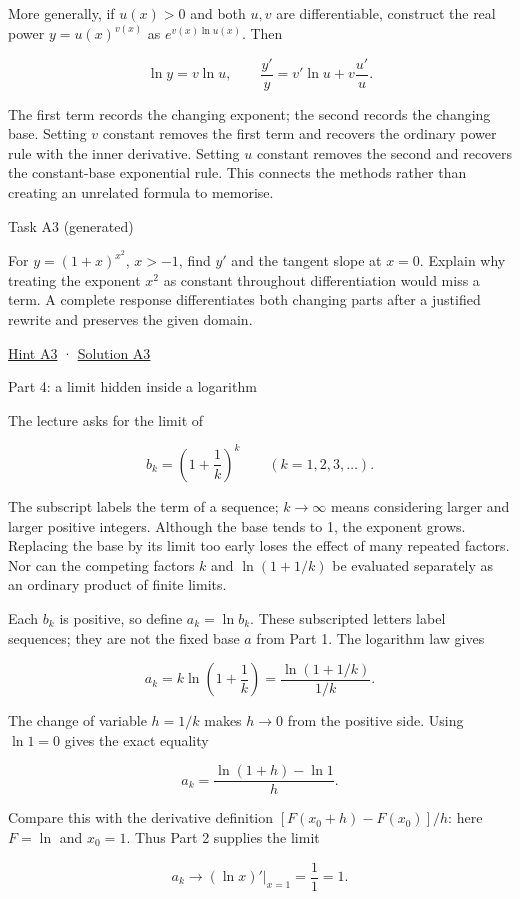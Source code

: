 \documentclass[
  11pt,
]{article}
\begin{document}
More generally, if \(u(x)>0\) and both \(u,v\) are differentiable,
construct the real power \(y=u(x)^{v(x)}\) as \(e^{v(x)\ln u(x)}\). Then

\[
\ln y=v\ln u,\qquad
\frac{y'}{y}=v'\ln u+v\frac{u'}u.
\]

The first term records the changing exponent; the second records the
changing base. Setting \(v\) constant removes the first term and
recovers the ordinary power rule with the inner derivative. Setting
\(u\) constant removes the second and recovers the constant-base
exponential rule. This connects the methods rather than creating an
unrelated formula to memorise.

Task A3 (generated)

For \(y=(1+x)^{x^2}\), \(x>-1\), find \(y'\) and the tangent slope at
\(x=0\). Explain why treating the exponent \(x^2\) as constant
throughout differentiation would miss a term. A complete response
differentiates both changing parts after a justified rewrite and
preserves the given domain.

\protect\hyperlink{hint-a3}{Hint A3} ·
\protect\hyperlink{solution-a3}{Solution A3}

Part 4: a limit hidden inside a logarithm

The lecture asks for the limit of

\[
b_k=\left(1+\frac1k\right)^k\qquad(k=1,2,3,\ldots).
\]

The subscript labels the term of a sequence; \(k\to\infty\) means
considering larger and larger positive integers. Although the base tends
to 1, the exponent grows. Replacing the base by its limit too early
loses the effect of many repeated factors. Nor can the competing factors
\(k\) and \(\ln(1+1/k)\) be evaluated separately as an ordinary product
of finite limits.

Each \(b_k\) is positive, so define \(a_k=\ln b_k\). These subscripted
letters label sequences; they are not the fixed base \(a\) from Part 1.
The logarithm law gives

\[
a_k=k\ln\left(1+\frac1k\right)
=\frac{\ln(1+1/k)}{1/k}.
\]

The change of variable \(h=1/k\) makes \(h\to0\) from the positive side.
Using \(\ln1=0\) gives the exact equality

\[
a_k=\frac{\ln(1+h)-\ln1}{h}.
\]

Compare this with the derivative definition \([F(x_0+h)-F(x_0)]/h\):
here \(F=\ln\) and \(x_0=1\). Thus Part 2 supplies the limit

\[
a_k\longrightarrow (\ln x)'\big|_{x=1}=\frac11=1.
\]
\end{document}
